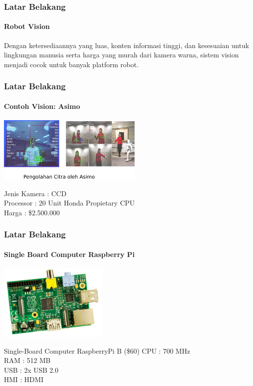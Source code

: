 \documentclass[table,dvipsnames]{beamer}
\begin{document}
\begin{frame}
\frametitle{Latar Belakang}
\framesubtitle{Robot Vision}
\begin{block}{\cite{why_vision}}
Dengan ketersediaannya yang luas, konten informasi tinggi, dan kesesuaian untuk lingkungan manusia serta harga yang murah dari kamera warna, sistem vision menjadi cocok untuk banyak platform robot.
\end{block}
\end{frame}

\begin{frame}
\frametitle{Latar Belakang}
\framesubtitle{Contoh Vision: Asimo}
\begin{center}
 \includegraphics[width=200pt]{./latar_belakang/asimo_vision/asimo_vision}
\end{center}
\begin{block}{\cite{asimo_cpu}}
Jenis Kamera : CCD\\
Processor : 20 Unit Honda Propietary CPU\\
Harga : \$2.500.000\\
\end{block}
\end{frame}

\begin{frame}
\frametitle{Latar Belakang}
\framesubtitle{Single Board Computer Raspberry Pi}
\begin{center}
 \includegraphics[width=150pt]{./latar_belakang/raspi/raspi}
\end{center}
\begin{block}{Single-Board Computer RaspberryPi B (\$60)}
CPU : 700 MHz\\
RAM : 512 MB\\
USB	: 2x USB 2.0\\
HMI : HDMI\\
\end{block}
\end{frame}
\end{document}
